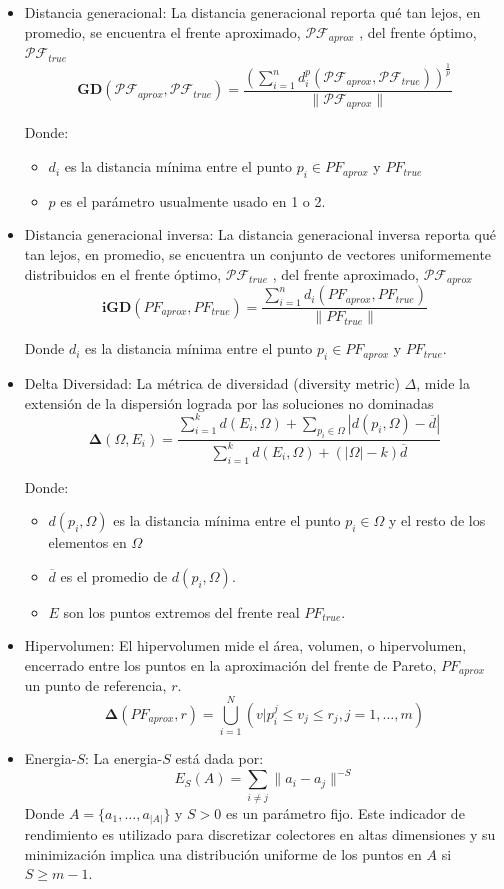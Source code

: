 \documentclass[letterpaper,10pt]{article}
\begin{document}
\begin{itemize}
 \item Distancia generacional: La distancia generacional reporta qué tan lejos, en promedio, se encuentra el frente aproximado, $\mathcal{PF}_{aprox}$ , del frente óptimo, $\mathcal{PF}_{true}$
 $$\bm{GD}(\mathcal{PF}_{aprox},\mathcal{PF}_{true})=\frac{(\sum^n_{i=1} d_i^p(\mathcal{PF}_{aprox},\mathcal{PF}_{true}))^{\frac{1}{p}}}{\|\mathcal{PF}_{aprox}\|}$$
 
 Donde:
 \begin{itemize}
  \item $d_i$ es la distancia mínima entre el punto $p_i \in PF_{aprox}$ y $PF_{true}$  
  \item $p$ es el parámetro usualmente usado en 1 o 2.
 \end{itemize}
 
 
 \item Distancia generacional inversa: La distancia generacional inversa reporta qué tan lejos, en promedio, se encuentra un conjunto de vectores uniformemente distribuidos en el frente óptimo, $\mathcal{PF}_{true}$ , del frente aproximado, $\mathcal{PF}_{aprox}$
 $$\bm{iGD}(PF_{aprox},PF_{true})=\frac{\sum^n_{i=1} d_i(PF_{aprox},PF_{true})}{\|PF_{true}\|}$$
 
Donde $d_i$ es la distancia mínima entre el punto $p_i \in PF_{aprox}$ y $PF_{true}$.


 \item Delta Diversidad: La métrica de diversidad (diversity metric) $\Delta$, mide la extensión de la dispersión lograda por las soluciones no dominadas
 $$\bm{\Delta}(\Omega,E_i)=\frac{\sum^k_{i=1} d(E_i,\Omega) + \sum_{p_i \in \Omega} |d(p_i,\Omega)-\overline{d}|}{\sum^k_{i=1} d(E_i,\Omega) + (|\Omega| - k)\overline{d}}$$
 
 Donde:
 \begin{itemize}
  \item $d(p_i,\Omega)$ es la distancia mínima entre el punto $p_i \in \Omega$ y el resto de los elementos en $\Omega$  
  \item $\overline{d}$ es el promedio de $d(p_i,\Omega)$.
  \item $E$ son los puntos extremos del frente real $PF_{true}$.
 \end{itemize}

 \item Hipervolumen: El hipervolumen mide el área, volumen, o hipervolumen, encerrado entre los puntos en la aproximación del frente de Pareto, $PF_{aprox}$
un punto de referencia, $r$.
 $$\bm{\Delta}(PF_{aprox},r)=\bigcup^N_{i=1} (v|p^j_i \leq v_j \leq r_j , j = 1, \dots, m) $$
 
 \item Energia-$S$: La energia-$S$ está dada por:
 $$E_S(A)= \sum_{i\neq j}\| a_i - a_j\|^{-S}$$
 Donde $A = \{ a_1, \dots, a_{|A|}\}$ y $S>0$ es un parámetro fijo. Este indicador de rendimiento es utilizado para discretizar colectores en altas dimensiones y
 su minimización implica una distribución uniforme de los puntos en $A$ si $S\geq m-1$\cite{hardin2004discretizing}.
\end{itemize}
\end{document}
